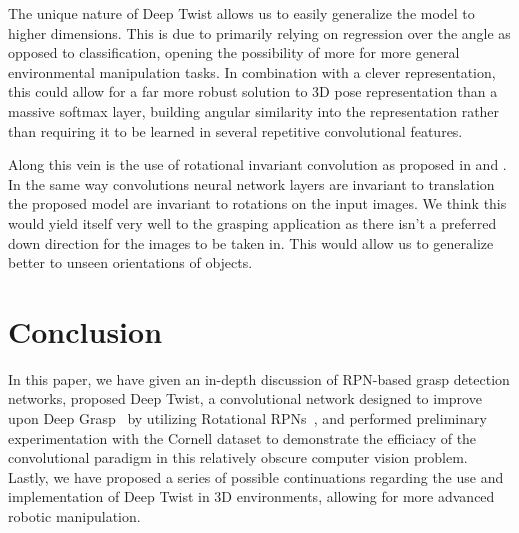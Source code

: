 \documentclass[10pt,twocolumn,letterpaper]{article}
\begin{document}
The unique nature of Deep Twist allows us to easily generalize the model to higher dimensions. This is due to primarily relying on regression over the angle as opposed to classification, opening the possibility of more for more general environmental manipulation tasks. In combination with a clever representation, this could allow for a far more robust solution to 3D pose representation than a massive softmax layer, building angular similarity into the representation rather than requiring it to be learned in several repetitive convolutional features.

Along this vein is the use of rotational invariant convolution as proposed in \cite{RotationInvariance} and \cite{RotationInvarianceVHS}. In the same way convolutions neural network layers are invariant to translation the proposed model are invariant to rotations on the input images. We think this would yield itself very well to the grasping application as there isn't a preferred down direction for the images to be taken in. This would allow us to generalize better to unseen orientations of objects.

\section{Conclusion}

In this paper, we have given an in-depth discussion of RPN-based grasp detection networks, proposed Deep Twist, a convolutional network designed to improve upon Deep Grasp~\cite{vela2018} by utilizing Rotational RPNs~\cite{ma18}, and performed preliminary experimentation with the Cornell dataset to demonstrate the efficiacy of the convolutional paradigm in this relatively obscure computer vision problem. Lastly, we have proposed a series of possible continuations regarding the use and implementation of Deep Twist in 3D environments, allowing for more advanced robotic manipulation.

{\small


}
\end{document}
